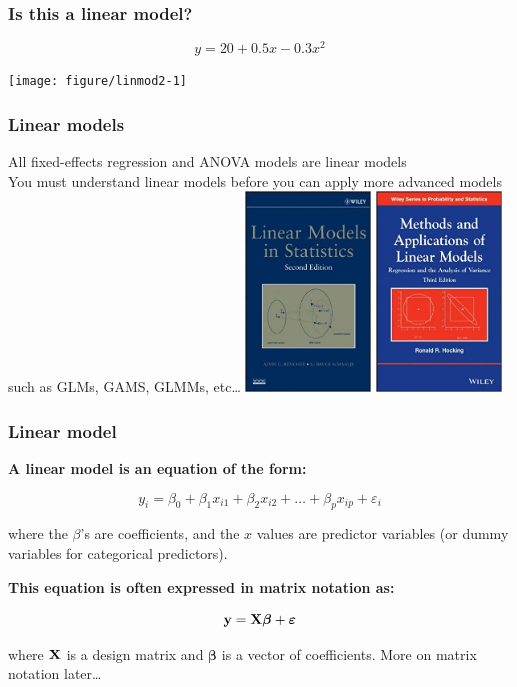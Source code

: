 \documentclass[color=usenames,dvipsnames]{beamer}\usepackage[]{graphicx}\usepackage[]{color}
\begin{document}
\begin{frame}[fragile]
  \frametitle{Is this a linear model?}
\[
y = 20 + 0.5 x - 0.3 x^2
\]

\begin{center}
  \texttt{[image: figure/linmod2-1]}
\end{center}
\end{frame}



\begin{frame}
  \frametitle{Linear models}
  All fixed-effects regression and ANOVA models are linear models \\
  \vfill
  You must understand linear models before you can apply more advanced models such as GLMs, GAMS, GLMMs, etc\dots
  \vfill
  \centering
  \includegraphics[width=0.25\textwidth]{figs/Rencher_Schaal_book} \hspace{1cm}
  \includegraphics[width=0.25\textwidth]{figs/Hocking_book} \\
\end{frame}



\begin{frame}
  \frametitle{Linear model}
{\bf A linear model is an equation of the form:}

\[
y_i = \beta_0 + \beta_1 x_{i1} + \beta_2 x_{i2} + \ldots + \beta_p x_{ip} + \varepsilon_i
\]

where the $\beta$'s are coefficients, and the $x$ values are predictor
variables (or dummy variables for categorical predictors).
\pause

\vspace{0.5cm}

{\bf This equation is often expressed in matrix notation as:}

\[
{\bf y} = {\bf X} {\bm{\beta}} + {\bm \varepsilon}
\]

where $\bf X$ is a \alert{design matrix} and $\bm{\beta}$ is a
vector of coefficients. \pause More on matrix notation later\dots
\end{frame}
\end{document}
